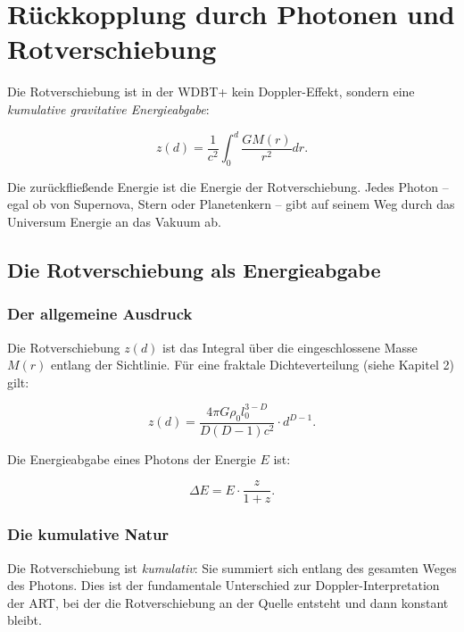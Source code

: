 \chapter{Rückkopplung durch Photonen und Rotverschiebung}

Die Rotverschiebung ist in der WDBT+ kein Doppler-Effekt, sondern eine \emph{kumulative gravitative Energieabgabe}:

\begin{equation}
z(d) = \frac{1}{c^2} \int_0^d \frac{G M(r)}{r^2} dr. \tag{4.1}
\end{equation}

Die zurückfließende Energie ist die Energie der Rotverschiebung. Jedes Photon – egal ob von Supernova, Stern oder Planetenkern – gibt auf seinem Weg durch das
Universum Energie an das Vakuum ab.

\section{Die Rotverschiebung als Energieabgabe}

\subsection{Der allgemeine Ausdruck}

Die Rotverschiebung \(z(d)\) ist das Integral über die eingeschlossene Masse \(M(r)\) entlang der Sichtlinie. Für eine fraktale Dichteverteilung (siehe Kapitel 2)
gilt:

\begin{equation}
z(d) = \frac{4\pi G \rho_0 l_0^{3-D}}{D(D-1)c^2} \cdot d^{D-1}. \tag{4.2}
\end{equation}

Die Energieabgabe eines Photons der Energie \(E\) ist:

\begin{equation}
\Delta E = E \cdot \frac{z}{1+z}. \tag{4.3}
\end{equation}

\subsection{Die kumulative Natur}

Die Rotverschiebung ist \emph{kumulativ}: Sie summiert sich entlang des gesamten Weges des Photons. Dies ist der fundamentale Unterschied zur Doppler-Interpretation
der ART, bei der die Rotverschiebung an der Quelle entsteht und dann konstant bleibt.

